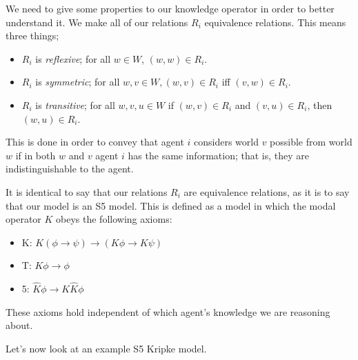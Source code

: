 \documentclass[12pt, a4paper]{article}
\begin{document}
\bigskip 

We need to give some properties to our knowledge operator in order to better
understand it. We make all of our relations $R_i$ equivalence relations. This
means three things;

\begin{itemize}
\item $R_i$ is \textit{reflexive}; for all $w \in W$, $(w, w) \in R_i$.
\item $R_i$ is \textit{symmetric}; for all $w, v \in W, (w, v) \in R_i$ iff $(v,
  w) \in R_i$.
\item $R_i$ is \textit{transitive}; for all $w, v, u \in W$ if $(w, v) \in R_i$
  and $(v, u) \in R_i$, then $(w, u) \in R_i$.
\end{itemize}

This is done in order to convey that agent $i$ considers world $v$ possible from
world $w$ if in both $w$ and $v$ agent $i$ has the same information; that is,
they are indistinguishable to the agent.

It is identical to say that our relations $R_i$ are equivalence relations, as it
is to say that our model is an \textsf{S5} model. This is defined as a model in
which the modal operator $K$ obeys the following axioms:

\begin{itemize}
\item \textsf{K}: $K (\phi \rightarrow \psi) \rightarrow (K \phi \rightarrow K
  \psi)$
\item \textsf{T}: $K \phi \rightarrow \phi$
\item \textsf{5}: $\widehat K \phi \rightarrow K \widehat K \phi$
\end{itemize}

These axioms hold independent of which agent's knowledge we are reasoning about. 

\bigskip \bigskip \bigskip

Let's now look at an example \textsf{S5} Kripke model.

\begin{center}
\end{center}
\end{document}
